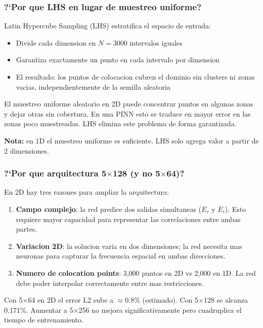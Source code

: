 \subsubsection*{?`Por que LHS en lugar de muestreo uniforme?}
\begin{tcolorbox}[colback=gray!5, colframe=ujatgray, breakable]
Latin Hypercube Sampling (LHS) estratifica el espacio de entrada:
\begin{itemize}
  \item Divide cada dimension en $N = 3000$ intervalos iguales
  \item Garantiza exactamente un punto en cada intervalo por dimension
  \item El resultado: los puntos de colocacion cubren el dominio sin clusters ni
        zonas vacias, independientemente de la semilla aleatoria
\end{itemize}

El muestreo uniforme aleatorio en 2D puede concentrar puntos en algunas zonas y
dejar otras sin cobertura. En una PINN esto se traduce en mayor error en las zonas
poco muestreadas. LHS elimina este problema de forma garantizada.

\textbf{Nota:} en 1D el muestreo uniforme es suficiente. LHS solo agrega valor
a partir de 2 dimensiones.
\end{tcolorbox}

\subsubsection*{?`Por que arquitectura 5$\times$128 (y no 5$\times$64)?}
\begin{tcolorbox}[colback=gray!5, colframe=ujatgray, breakable]
En 2D hay tres razones para ampliar la arquitectura:
\begin{enumerate}
  \item \textbf{Campo complejo}: la red predice dos salidas simultaneas ($E_r$ y $E_i$).
        Esto requiere mayor capacidad para representar las correlaciones entre ambas partes.
  \item \textbf{Variacion 2D}: la solucion varia en dos dimensiones; la red necesita
        mas neuronas para capturar la frecuencia espacial en ambas direcciones.
  \item \textbf{Numero de colocation points}: 3,000 puntos en 2D vs 2,000 en 1D.
        La red debe poder interpolar correctamente entre mas restricciones.
\end{enumerate}
Con 5$\times$64 en 2D el error L2 sube a $\approx$0.8\% (estimado). Con 5$\times$128
se alcanza 0.171\%. Aumentar a 5$\times$256 no mejora significativamente pero
cuadruplica el tiempo de entrenamiento.
\end{tcolorbox}

